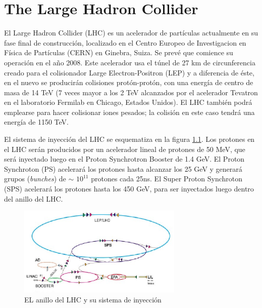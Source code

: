 
%
%
\chapter{The Large Hadron Collider}

 El Large Hadron Collider (LHC) es un acelerador de part\'iculas actualmente en su fase final de construcci\'on, localizado en el Centro Europeo de Investigacion en F\'isica de Part\'iculas (CERN) en Ginebra, Suiza. Se prev\'e que comience su operaci\'on en el a\~no 2008. Este acelerador usa el t\'unel de 27 km de circunferencia creado para el colisionador Large Electron-Positron (LEP) y a diferencia de \'este, en el nuevo se producir\'an colisiones prot\'on-prot\'on, con una  energ\'ia de centro de masa de 14 TeV (7 veces mayor a los 2 TeV alcanzados por el acelerador Tevatron en el laboratorio Fermilab en Chicago, Estados Unidos). El LHC tambi\'en podr\'a emplearse para hacer colisionar iones pesados; la colisi\'on en este caso tendr\'a una energ\'ia de 1150 TeV.

   El sistema de inyecci\'on del LHC se esquematiza en la figura \ref{fig:LHC1}. Los protones en el LHC ser\'an producidos por un acelerador lineal de protones de 50 MeV, que ser\'a inyectado luego en el Proton Synchrotron Booster de 1.4 GeV. El Proton Synchroton (PS) acelerar\'a los protones hasta alcanzar los 25 GeV y generar\'a grupos (\emph{bunches}) de $\sim$ $10^{11}$ protones cada 25ns. El Super Proton Synchroton (SPS) acelerar\'a los protones hasta los 450 GeV, para ser inyectados luego dentro del anillo del LHC\cite{Valeria}.

\begin{figure}[htbp]
  \begin{center}
      \includegraphics[width=0.7\textwidth]{Fig2/LHC.eps}
    \caption{EL anillo del LHC y su sistema de inyecci\'on}
    \label{fig:LHC1}
  \end{center}
\end{figure}

